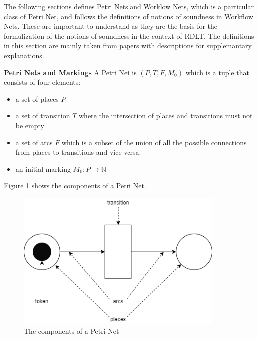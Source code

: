 The following sections defines Petri Nets and Worklow Nets, which is a particular class of Petri Net, and follows the definitions of notions of soundness in Workflow Nets. These are important to understand as they are the basis for the formulization of the notions of soundness in the context of RDLT. The definitions in this section are mainly taken from papers \cite{Malinao2017} \cite{MalinaoPJS2023} \cite{Aalst2011} \cite{Aalst1996}with descriptions for supplemantary explanations.

\begin{defn}\textbf{Petri Nets and Markings} \cite{Aalst1996} \cite{MalinaoPJS2023}
    \label{PetriDef}
    A Petri Net is $ (P,T,F,M_0) $ which is a tuple that consists of four elements:
    \begin{itemize}
        \item a set of places $ P $ 
        \item a set of transition $ T $ where the intersection of places and transitions must not be empty
        \item a set of arcs $ F $ which is a subset of the union of all the possible connections from places to transitions and vice versa.
        \item an initial marking $ M_0 : P \rightarrow \mathbb{N}$
    \end{itemize}
\end{defn}

Figure \ref{PNComponents} shows the components of a Petri Net. 

\begin{figure}[H]
    \centering
    \includegraphics[width=10cm]{../figures/PN Components.png}
    \caption{The components of a Petri Net}
    \label{PNComponents}
\end{figure}

